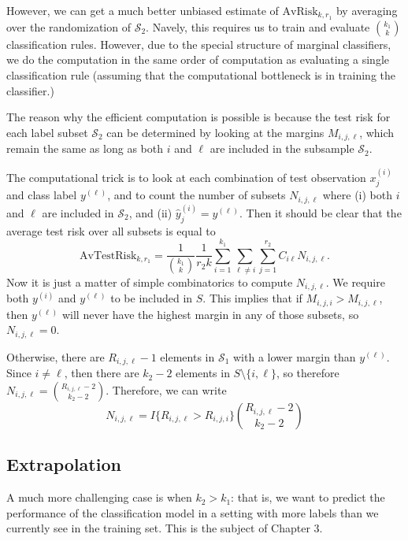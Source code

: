 However, we can get a much better unbiased estimate of
$\text{AvRisk}_{k, r_1}$ by averaging over the randomization of
$\mathcal{S}_2$.  Navely, this requires us to train and evaluate
${k_1}\choose{k}$ classification rules.  However, due to the special
structure of marginal classifiers, we do the computation in the same
order of computation as evaluating a single classification rule
(assuming that the computational bottleneck is in training the
classifier.)

The reason why the efficient computation is possible is because the
test risk for each label subset $\mathcal{S}_2$ can be determined by
looking at the margins $M_{i, j, \ell}$, which remain the same as long
as both $i$ and $\ell$ are included in the subsample $\mathcal{S}_2$.

The computational trick is to look at each combination of test
observation $x_j^{(i)}$ and class label $y^{(\ell)}$, and to count the
number of subsets $N_{i, j, \ell}$ where (i) both $i$ and $\ell$ are
included in $\mathcal{S}_2$, and (ii) $\hat{y}_j^{(i)} = y^{(\ell)}$.  Then it
should be clear that the average test risk over all subsets is equal
to
\begin{equation}\label{eq:avtestrisk}
\text{AvTestRisk}_{k, r_1} = \frac{1}{{{k_1}\choose{k}}}\frac{1}{r_2 k} \sum_{i=1}^{k_1} \sum_{\ell\neq i} \sum_{j=1}^{r_2} C_{i\ell}N_{i, j, \ell}.
\end{equation}
Now it is just a matter of simple combinatorics to compute
$N_{i,j,\ell}$.  We require both $y^{(i)}$ and $y^{(\ell)}$ to be
included in $S$.  This implies that if $M_{i,j,i} > M_{i,j,\ell}$,
then $y^{(\ell)}$ will never have the highest margin in any of those
subsets, so $N_{i,j,\ell} = 0$.

Otherwise, there are $R_{i,j,\ell} - 1$ elements in $\mathcal{S}_1$
with a lower margin than $y^{(\ell)}$.  Since $i \neq \ell$, then there
are $k_2-2$ elements in $S \setminus \{i, \ell\}$, so therefore $N_{i,
j, \ell} = {{R_{i,j,\ell} - 2}\choose{k_2 - 2}}$.  Therefore, we can write
\begin{equation}\label{eq:avtestrisk_nil}
N_{i,j,\ell} = I\{R_{i,j,\ell} > R_{i,j,i}\}{{R_{i,j,\ell} -2}\choose{k_2 - 2}}
\end{equation}

\subsection{Extrapolation}

A much more challenging case is when $k_2 > k_1$: that is, we want to
predict the performance of the classification model in a setting with
more labels than we currently see in the training set.  This is the
subject of Chapter 3.

